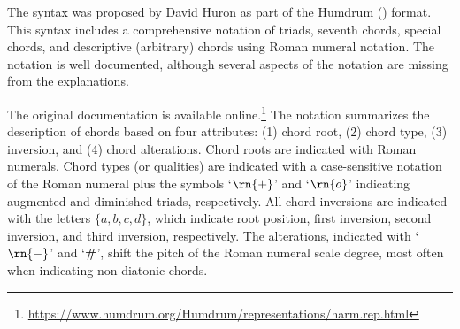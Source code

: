 The  syntax was proposed by David Huron as part
of the Humdrum () format. This syntax includes
a comprehensive notation of triads, seventh chords, special
chords, and descriptive (arbitrary) chords using Roman
numeral notation. The notation is well documented, although
several aspects of the notation are missing from the
explanations.

The original  documentation is available
online.\footnote{\href{https://www.humdrum.org/Humdrum/representations/harm.rep.html}{https://www.humdrum.org/Humdrum/representations/harm.rep.html}}
The notation summarizes the description of chords based on
four attributes: (1) chord root, (2) chord type, (3)
inversion, and (4) chord alterations. Chord roots are
indicated with Roman numerals. Chord types (or qualities)
are indicated with a case-sensitive notation of the Roman
numeral plus the symbols `$\rn{+}$' and `$\rn{o}$'
indicating augmented and diminished triads, respectively.
All chord inversions are indicated with the letters $\{a, b,
c, d\}$, which indicate root position, first inversion,
second inversion, and third inversion, respectively. The
alterations, indicated with `$\rn{-}$' and
`\textbf{\#}', shift the pitch of the Roman numeral
scale degree, most often when indicating non-diatonic
chords.
